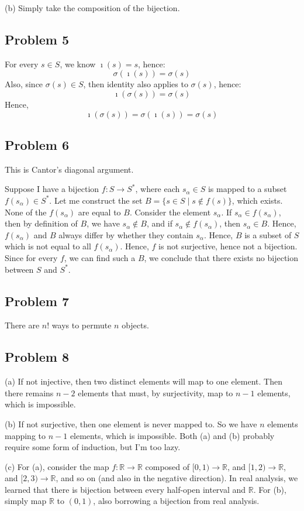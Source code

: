 \documentclass{book}
\begin{document}
\noindent
(b)
Simply take the composition of the bijection.

\subsection*{Problem 5}
For every $s \in S$, we know $\imath(s) = s$, hence:
$$\sigma(\imath(s)) = \sigma(s)$$
Also, since $\sigma(s) \in S$, then identity also applies to $\sigma(s)$, hence:
$$\imath(\sigma(s)) = \sigma(s)$$
Hence,
$$\imath(\sigma(s)) = \sigma(\imath(s)) = \sigma(s)$$

\subsection*{Problem 6}
This is Cantor's diagonal argument.

Suppose I have a bijection $f: S \rightarrow S^*$, where each $s_\alpha \in S$ is mapped to a subset $f(s_\alpha) \in S^*$. Let me construct the set $B = \{ s \in S \mid s \not \in f(s) \}$, which exists. None of the $f(s_\alpha)$ are equal to $B$. Consider the element $s_\alpha$. If $s_\alpha \in f(s_\alpha)$, then by definition of $B$, we have $s_\alpha \not \in B$, and if $s_\alpha \not \in f(s_\alpha)$, then $s_\alpha \in B$. Hence, $f(s_\alpha)$ and $B$ always differ by whether they contain $s_\alpha$. Hence, $B$ is a subset of $S$ which is not equal to all $f(s_\alpha)$. Hence, $f$ is not surjective, hence not a bijection. Since for every $f$, we can find such a $B$, we conclude that there exists no bijection between $S$ and $S^*$.

\subsection*{Problem 7}
There are $n!$ ways to permute $n$ objects.

\subsection*{Problem 8}
(a)
If not injective, then two distinct elements will map to one element. Then there remains $n - 2$ elements that must, by surjectivity, map to $n - 1$ elements, which is impossible.

\noindent
(b)
If not surjective, then one element is never mapped to. So we have $n$ elements mapping to $n - 1$ elements, which is impossible. Both (a) and (b) probably require some form of induction, but I'm too lazy.

\noindent
(c)
For (a), consider the map $f: \mathbb{R} \rightarrow \mathbb{R}$ composed of $[0, 1) \rightarrow \mathbb{R}$, and $[1, 2) \rightarrow \mathbb{R}$, and $[2, 3) \rightarrow \mathbb{R}$, and so on (and also in the negative direction). In real analysis, we learned that there is bijection between every half-open interval and $\mathbb{R}$. For (b), simply map $\mathbb{R}$ to $(0, 1)$, also borrowing a bijection from real analysis.
\end{document}

